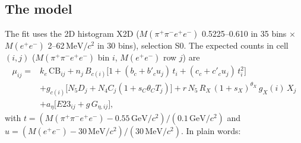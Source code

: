 \documentclass[11pt,a4paper]{article}
\newcommand{\Mfour}{\ensuremath{M(\pi^{+}\pi^{-}e^{+}e^{-})}\xspace}
\newcommand{\Mee}{\ensuremath{M(e^{+}e^{-})}\xspace}
\newcommand{\GeVcc}{\ensuremath{\mathrm{GeV}/c^{2}}\xspace}
\newcommand{\MeVcc}{\ensuremath{\mathrm{MeV}/c^{2}}\xspace}
\begin{document}
\subsection{The model}
\label{sec:x17model}
The fit uses the 2D histogram X2D (\Mfour 0.5225--0.610 in 35 bins $\times$ \Mee 2--62\,\MeVcc in 30 bins), selection S0. The expected counts in cell
$(i,j)$ (\Mfour bin $i$, \Mee row $j$) are
\begin{align}
\mu_{ij}={}&k_e\,\mathrm{CB}_{ij}+n_j\,B_{c(i)}\big[1+(b_c+b'_cu_j)\,t_i+(c_c+c'_cu_j)\,t_i^2\big]\nonumber\\
&+g_{c(i)}\big[N_5D_j+N_4C_j(1+s_C\theta_CT_j)\big]+r\,N_5\,R_X\,(1+s_X)^{\theta_X}\,g_X(i)\,X_j\nonumber\\
&+a_\eta\big[E23_{ij}+g\,G_{\eta,ij}\big],
\label{eq:x17}
\end{align}
with $t=(\Mfour-0.55\,\GeVcc)/(0.1\,\GeVcc)$ and $u=(\Mee-30\,\MeVcc)/(30\,\MeVcc)$.
In plain words:
\end{document}
